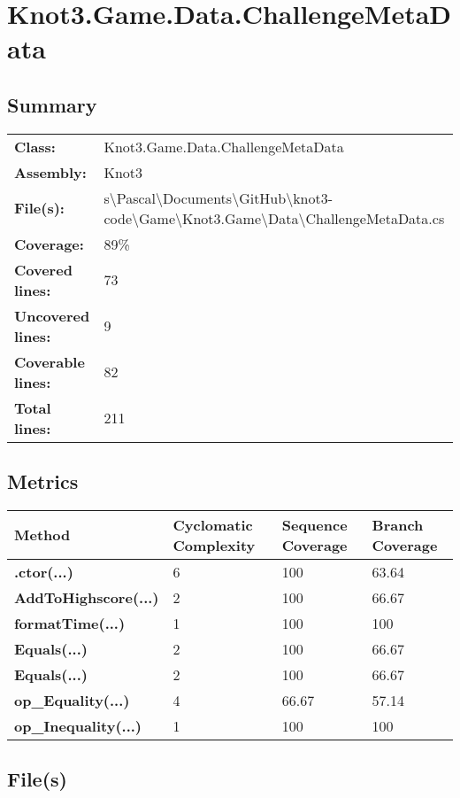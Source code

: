 \documentclass[a4paper,10pt]{article}
\begin{document}
\section{Knot3.Game.Data.ChallengeMetaData}
\subsection{Summary}
\begin{longtable}[l]{ll}
\textbf{Class:} & Knot3.Game.Data.ChallengeMetaData\\
\textbf{Assembly:} & Knot3\\
\textbf{File(s):} & \begin{minipage}[t]{12cm}{s\textbackslash Pascal\textbackslash Documents\textbackslash GitHub\textbackslash knot3-code\textbackslash Game\textbackslash Knot3.Game\textbackslash Data\textbackslash ChallengeMetaData.cs}\end{minipage} \\
\textbf{Coverage:} & 89\%\\
\textbf{Covered lines:} & 73\\
\textbf{Uncovered lines:} & 9\\
\textbf{Coverable lines:} & 82\\
\textbf{Total lines:} & 211\\
\end{longtable}
\subsection{Metrics}
\begin{longtable}[l]{|l|l|l|l|}
\hline
\textbf{Method} & \textbf{Cyclomatic Complexity} & \textbf{Sequence Coverage} & \textbf{Branch Coverage}\\
\hline
\textbf{.ctor(...)} & 6 & 100 & 63.64\\
\hline
\textbf{AddToHighscore(...)} & 2 & 100 & 66.67\\
\hline
\textbf{formatTime(...)} & 1 & 100 & 100\\
\hline
\textbf{Equals(...)} & 2 & 100 & 66.67\\
\hline
\textbf{Equals(...)} & 2 & 100 & 66.67\\
\hline
\textbf{op\_Equality(...)} & 4 & 66.67 & 57.14\\
\hline
\textbf{op\_Inequality(...)} & 1 & 100 & 100\\
\hline
\end{longtable}
\subsection{File(s)}
\end{document}
